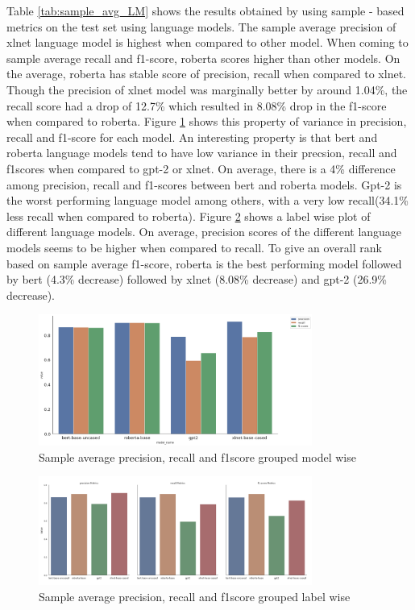 Table \ref{tab:sample_avg_LM} shows the results obtained by using sample - based metrics on the test set using language models. The sample average precision of xlnet language model is highest when compared to other model. When coming to sample average recall and f1-score, roberta scores higher than other models. On the average, roberta has stable score of precision, recall when compared to xlnet. Though the precision of xlnet model was marginally better by around 1.04\%, the recall score had a drop of 12.7\%  which resulted in 8.08\% drop in the f1-score when compared to roberta. Figure \ref{fig:model_wise_group_LM} shows this property of variance in precision, recall and f1-score for each model. An interesting property is that bert and roberta language models tend to have low variance in their precsion, recall and f1scores when compared to gpt-2 or xlnet. On average, there is a 4\% difference among precision, recall and f1-scores between bert and roberta models. Gpt-2 is the worst performing language model among others, with a very low recall(34.1\% less recall when compared to roberta). Figure \ref{fig:label_wise_group_LM} shows a label wise plot of different language models. On average, precision scores of the different language models seems to be higher when compared to recall. To give an overall rank based on sample average f1-score, roberta is the best performing model followed by bert (4.3\% decrease) followed by xlnet (8.08\% decrease) and gpt-2 (26.9\% decrease). 
\begin{figure}[]
    \centering
    \includegraphics[width=0.8\textwidth]{thesis/figures/Model_wise_prf .png}
    \caption{Sample average precision, recall and f1score grouped model wise }
    \label{fig:model_wise_group_LM}
\end{figure}


\begin{figure}[]
    \centering
    \includegraphics[width=0.8\textwidth]{thesis/figures/labelwise_wise_prf.png}
    \caption{Sample average precision, recall and f1score grouped label wise }
    \label{fig:label_wise_group_LM}
\end{figure}
\pagebreak

